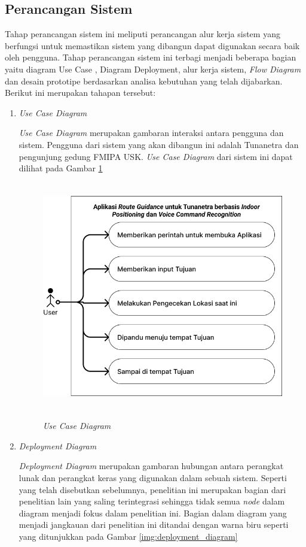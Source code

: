 \subsection{Perancangan Sistem}
Tahap perancangan sistem ini meliputi perancangan alur kerja sistem yang berfungsi untuk memastikan sistem yang dibangun dapat digunakan secara baik oleh pengguna. Tahap perancangan sistem ini terbagi menjadi beberapa bagian yaitu diagram Use Case , Diagram Deployment, alur kerja sistem, \textit{Flow Diagram} dan desain prototipe berdasarkan analisa kebutuhan yang telah dijabarkan. Berikut ini merupakan tahapan tersebut:



\begin{enumerate}
\item \textit{Use Case Diagram}
\par \textit{Use Case Diagram} merupakan gambaran interaksi antara pengguna dan sistem. Pengguna dari sistem yang akan dibangun ini adalah Tunanetra dan pengunjung gedung FMIPA USK. \textit{Use Case Diagram} dari sistem ini dapat dilihat pada Gambar \ref{img:use_case_diagram}

\begin{figure}[H]
\centering
{\includegraphics [width = 12cm, height= 10cm]{gambar/bab3/use_case_diagram}}
\caption{\textit{Use Case Diagram}}
\label{img:use_case_diagram}
\end{figure}

\newpage
\item \textit{Deployment Diagram}
\par \textit{Deployment Diagram} merupakan gambaran hubungan antara perangkat lunak dan perangkat keras yang digunakan dalam sebuah sistem. Seperti yang telah disebutkan sebelumnya, penelitian ini merupakan bagian dari penelitian lain yang saling terintegrasi sehingga tidak semua \textit{node} dalam diagram menjadi fokus dalam penelitian ini. Bagian dalam diagram yang menjadi jangkauan dari penelitian ini ditandai dengan warna biru seperti yang ditunjukkan pada Gambar \ref{img:deployment_diagram}


\end{enumerate}
